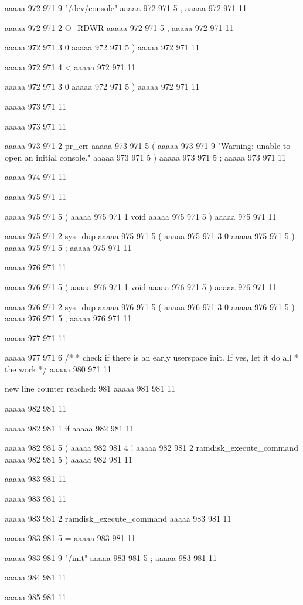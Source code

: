 {aaaaa 972 971
9
"/dev/console"
aaaaa 972 971
5
,
aaaaa 972 971
11
 
aaaaa 972 971
2
O_RDWR
aaaaa 972 971
5
,
aaaaa 972 971
11
 
aaaaa 972 971
3
0
aaaaa 972 971
5
)
aaaaa 972 971
11
 
aaaaa 972 971
4
<
aaaaa 972 971
11
 
aaaaa 972 971
3
0
aaaaa 972 971
5
)
aaaaa 972 971
11


aaaaa 973 971
11
	
aaaaa 973 971
11
	
aaaaa 973 971
2
pr_err
aaaaa 973 971
5
(
aaaaa 973 971
9
"Warning: unable to open an initial console.\n"
aaaaa 973 971
5
)
aaaaa 973 971
5
;
aaaaa 973 971
11


aaaaa 974 971
11


aaaaa 975 971
11
	
aaaaa 975 971
5
(
aaaaa 975 971
1
void
aaaaa 975 971
5
)
aaaaa 975 971
11
 
aaaaa 975 971
2
sys_dup
aaaaa 975 971
5
(
aaaaa 975 971
3
0
aaaaa 975 971
5
)
aaaaa 975 971
5
;
aaaaa 975 971
11


aaaaa 976 971
11
	
aaaaa 976 971
5
(
aaaaa 976 971
1
void
aaaaa 976 971
5
)
aaaaa 976 971
11
 
aaaaa 976 971
2
sys_dup
aaaaa 976 971
5
(
aaaaa 976 971
3
0
aaaaa 976 971
5
)
aaaaa 976 971
5
;
aaaaa 976 971
11


aaaaa 977 971
11
	
aaaaa 977 971
6
/*
	 * check if there is an early userspace init.  If yes, let it do all
	 * the work
	 */
aaaaa 980 971
11


new line counter reached: 981
aaaaa 981 981
11


aaaaa 982 981
11
	
aaaaa 982 981
1
if
aaaaa 982 981
11
 
aaaaa 982 981
5
(
aaaaa 982 981
4
!
aaaaa 982 981
2
ramdisk_execute_command
aaaaa 982 981
5
)
aaaaa 982 981
11


aaaaa 983 981
11
	
aaaaa 983 981
11
	
aaaaa 983 981
2
ramdisk_execute_command
aaaaa 983 981
11
 
aaaaa 983 981
5
=
aaaaa 983 981
11
 
aaaaa 983 981
9
"/init"
aaaaa 983 981
5
;
aaaaa 983 981
11


aaaaa 984 981
11


aaaaa 985 981
11
	
}

